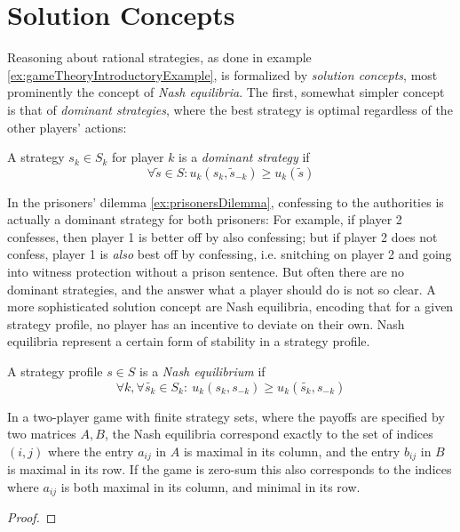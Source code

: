 \documentclass[a4paper]{scrreprt}
\begin{document}
    \section{Solution Concepts}
    Reasoning about rational strategies, as done in example \ref{ex:gameTheoryIntroductoryExample}, is formalized by \emph{solution concepts}, most prominently the concept of \emph{Nash equilibria}. The first, somewhat simpler concept is that of \emph{dominant strategies}, where the best strategy is optimal regardless of the other players' actions:
    
    \begin{defn}
        A strategy $s_k \in S_k$ for player $k$ is a \emph{dominant strategy} if 
        \[ \forall \tilde{s} \in S: u_k(s_k, \tilde{s}_{-k}) \geq u_k(\tilde{s}) \]
    \end{defn}
    
    In the prisoners' dilemma \ref{ex:prisonersDilemma}, confessing to the authorities is actually a dominant strategy for both prisoners:
    For example, if player 2 confesses, then player 1 is better off by also confessing; but if player 2 does not confess, player 1 is \emph{also} best off by confessing, i.e. snitching on player 2 and going into witness protection without a prison sentence.
    But often there are no dominant strategies, and the answer what a player should do is not so clear.
    A more sophisticated solution concept are Nash equilibria, encoding that for a given strategy profile, no player has an incentive to deviate on their own. Nash equilibria represent a certain form of stability in a strategy profile.
    
    \begin{defn}
        A strategy profile $s \in S$ is a \emph{Nash equilibrium} if
        \[
            \forall k, \forall \tilde{s_k} \in S_k:~ u_k(s_k, s_{-k}) \geq u_k(\tilde{s_k}, s_{-k})
        \]
        \label{def:nashEquilibriumRealValued}
    \end{defn}
    
    \begin{lemma} 
        In a two-player game with finite strategy sets, where the payoffs are specified by two matrices $A, B$, the Nash equilibria correspond
        exactly to the set of indices $(i, j)$ where the entry $a_{ij}$ in $A$ is maximal in its column, and the entry $b_{ij}$ in $B$ is maximal in its row.
        If the game is zero-sum this also corresponds to the indices where $a_{ij}$ is both maximal in its column, and minimal in its row.
    \end{lemma}
    \begin{proof}
    \end{proof}
\end{document}
